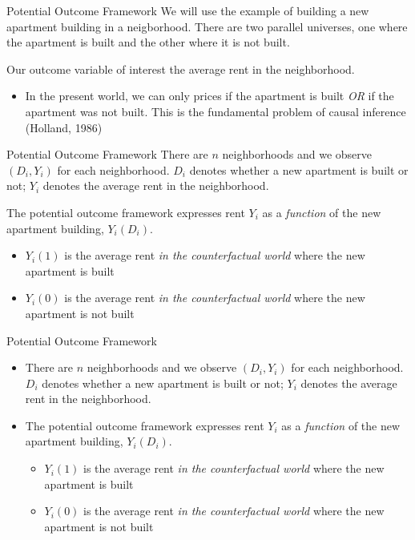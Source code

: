 \documentclass[aspectratio=169,t,11pt,table]{beamer}
\begin{document}
\begin{frame}{Potential Outcome Framework}{}
  We will use the example of building a new apartment building in a neigborhood. 
  There are two parallel universes, one where the apartment is built and the other where it is not built.

  \bigskip
  Our outcome variable of interest the average rent in the neighborhood.
  \begin{itemize}
    \item In the present world, we can only prices if the apartment is built \emph{OR} if the apartment was not built. This is the fundamental problem of causal inference (Holland, 1986)
  \end{itemize}
\end{frame}

\begin{frame}{Potential Outcome Framework}{}
  There are $n$ neighborhoods and we observe $(D_i, Y_i)$ for each neighborhood. $D_i$ denotes whether a new apartment is built or not; $Y_i$ denotes the average rent in the neighborhood. 
  
  \pause
  \bigskip
  The potential outcome framework expresses rent $Y_i$ as a \emph{function} of the new apartment building, $Y_i(D_i)$.
  \begin{itemize}
    \item $Y_i(1)$ is the average rent \emph{in the counterfactual world} where the new apartment is built
    \item $Y_i(0)$ is the average rent \emph{in the counterfactual world} where the new apartment is not built
  \end{itemize}
\end{frame}

\begin{frame}{Potential Outcome Framework}{}
  \begin{itemize}
    \item There are $n$ neighborhoods and we observe $(D_i, Y_i)$ for each neighborhood. $D_i$ denotes whether a new apartment is built or not; $Y_i$ denotes the average rent in the neighborhood. 

    \item The potential outcome framework expresses rent $Y_i$ as a \emph{function} of the new apartment building, $Y_i(D_i)$.
    \begin{itemize}
      \item $Y_i(1)$ is the average rent \emph{in the counterfactual world} where the new apartment is built
      \item $Y_i(0)$ is the average rent \emph{in the counterfactual world} where the new apartment is not built
    \end{itemize}
  \end{itemize}
\end{frame}
\end{document}
